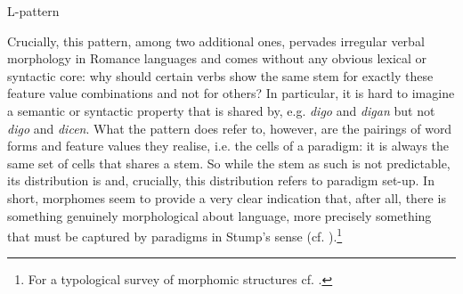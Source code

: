 \documentclass[output=paper]{langsci/langscibook}
\begin{document}
\begin{table}
\captionsetup{margin=.05\linewidth}
\begin{floatrow}
    {\caption{L-pattern \citep{Maiden2009}\label{tab:reiner:10}}}
    {\caption{Spanish example for L-pattern \citep{Maiden2009}\label{tab:reiner:11}}}
\end{floatrow}
\end{table}


Crucially, this pattern, among two additional ones, pervades irregular verbal morphology in Romance languages and comes without any obvious lexical or syntactic core: why should certain verbs show the same stem for exactly these feature value combinations and not for others? In particular, it is hard to imagine a semantic or syntactic property that is shared by, e.g. \textit{digo} and \textit{digan} but not \textit{digo} and \textit{dicen}. What the pattern does refer to, however, are the pairings of word forms and feature values they realise, i.e. the cells of a paradigm: it is always the same set of cells that shares a stem. So while the stem as such is not predictable, its distribution is and, crucially, this distribution refers to paradigm set-up. In short, morphomes seem to provide a very clear indication that, after all, there is something genuinely morphological about language, more precisely something that must be captured by paradigms in Stump’s sense (cf. ).\footnote{For a typological survey of morphomic structures cf. \citet{Herce2020}.}
\end{document}
